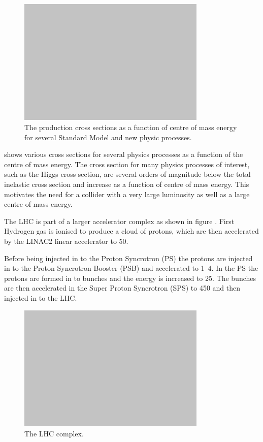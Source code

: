 \begin{figure}[htb!]
  \centering
  \includegraphics[width=0.8\textwidth]{placeholder}
  \caption{The production cross sections as a function of centre of mass energy
for several Standard Model and new physic processes.}
  \label{fig:LHCxsec}
\end{figure}

 shows various cross sections for several physics
processes as a function of the centre of mass energy. The cross section for many
physics processes of interest, such as the Higgs cross section, are several
orders of magnitude below the total inelastic cross section and increase as a
function of centre of mass energy. This motivates the need for a collider with a
very large luminosity as well as a large centre of mass energy.

The LHC is part of a larger accelerator complex as shown in figure
. First Hydrogen gas is ionised to produce a cloud of
protons, which are then accelerated by the LINAC2 linear accelerator to
\unit{50}{\MeV}.

Before being injected in to the Proton Syncrotron (PS) the protons are injected in to
the Proton Syncrotron Booster (PSB) and accelerated to \unit{1.4}{\GeV}. In the
PS the protons are formed in to bunches and the energy is increased to
\unit{25}{\GeV}. The bunches are then accelerated in the Super Proton
Syncrotron (SPS) to \unit{450}{\GeV} and then injected in to the LHC.


\begin{figure}[htb!]
  \centering
  \includegraphics[width=0.8\textwidth]{placeholder}
  \caption{The LHC complex.}
  \label{fig:LHCcomplex}
\end{figure}

